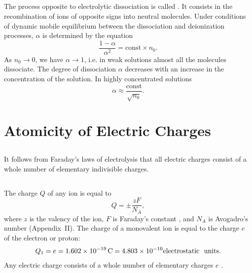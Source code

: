 \subsection{}\label{22.1.6} The process opposite to electrolytic dissociation  is called . It consists in the recombination of ions of opposite signs into neutral molecules. Under conditions of dynamic mobile equilibrium between the dissociation and deionization processes, $\alpha$ is determined by the equation
\begin{equation*}%
\frac{1 -\alpha}{\alpha^{2}} = \text{const} \times n_{0}.
\end{equation*}
As $n_{0} \to 0$, we have $\alpha \to 1$, i.e. in weak solutions almost all the molecules dissociate. The degree of dissociation $\alpha$ decreases with an increase in the concentration of the solution. In highly concentrated solutions
\begin{equation*}%
\alpha \approx \frac{\text{const}}{\sqrt{n_{0}}}.
\end{equation*}


\section{Atomicity of Electric Charges}
\label{sec-22.2}


\subsection{}\label{22.2.1} It follows from Faraday's laws of electrolysis that all electric charges consist of a whole number of elementary indivisible charges.

\subsection{}\label{22.2.2} The charge $Q$ of any ion is equal to 
\begin{equation*}%
Q = \pm \frac{zF}{N_{A}},
\end{equation*}
where $z$ is the valency of the ion, $F$ is Faraday's constant , and $N_{A}$ is Avogadro's number (Appendix~II). The charge of a monovalent ion is equal to the charge $e$ of the electron or proton:
\begin{equation*}%
Q_{1} = e = \SI{1.602d-19}{\coulomb} = \num{4.803d-10} \text{electrostatic\,\, units}.
\end{equation*}
Any electric charge consists of a whole number of elementary charges $e$ .

